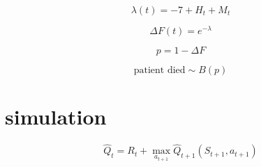 \documentclass[12pt]{article}
\begin{document}
\[
\lambda(t) = -7 + H_{t} + M_{t}
\]

\[
\Delta F(t) = e^{-\lambda}
\]

\[
p = 1 - \Delta F
\]

\[
\text{patient died} \sim B(p)
\]




\section{simulation} %
\label{sec:simulation}

\[
\hat{Q}_{t} = R_{t} + \max_{a_{t + 1}} \hat{Q}_{t+1}(S_{t+1}, a_{t+1})
\]



\end{document}
